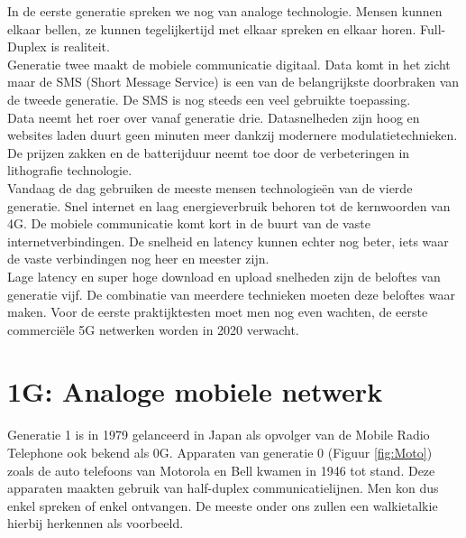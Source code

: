 \documentclass{article}
\begin{document}
\noindent In de eerste generatie spreken we nog van analoge technologie. Mensen kunnen elkaar bellen, ze kunnen tegelijkertijd met elkaar spreken en elkaar horen. Full-Duplex is realiteit.\\

\noindent Generatie twee maakt de mobiele communicatie digitaal. Data komt in het zicht maar de SMS (Short Message Service) is een van de belangrijkste doorbraken van de tweede generatie. De SMS is nog steeds een veel gebruikte toepassing.\\

\noindent Data neemt het roer over vanaf generatie drie. Datasnelheden zijn hoog en websites laden duurt geen minuten meer dankzij modernere modulatietechnieken. De prijzen zakken en de batterijduur neemt toe door de verbeteringen in lithografie technologie.\\

\noindent Vandaag de dag gebruiken de meeste mensen technologieën van de vierde generatie. Snel internet en laag energieverbruik behoren tot de kernwoorden van 4G. De mobiele communicatie komt kort in de buurt van de vaste internetverbindingen. De snelheid en latency kunnen echter nog beter, iets waar de vaste verbindingen nog heer en meester zijn.\\

\noindent Lage latency en super hoge download en upload snelheden zijn de beloftes van generatie vijf. De combinatie van meerdere technieken moeten deze beloftes waar maken. Voor de eerste praktijktesten moet men nog even wachten, de eerste commerciële 5G netwerken worden in 2020 verwacht. 

\newpage

\section{1G: Analoge mobiele netwerk}

Generatie 1 is in 1979 gelanceerd in Japan als opvolger van de Mobile Radio Telephone ook bekend als 0G. Apparaten van generatie 0 (Figuur \ref{fig:Moto}) zoals de auto telefoons van Motorola en Bell kwamen in 1946 tot stand. Deze apparaten maakten gebruik van half-duplex communicatielijnen. Men kon dus enkel spreken of enkel ontvangen. De meeste onder ons zullen een walkietalkie hierbij herkennen als voorbeeld. \cite{0G} \\
\end{document}
